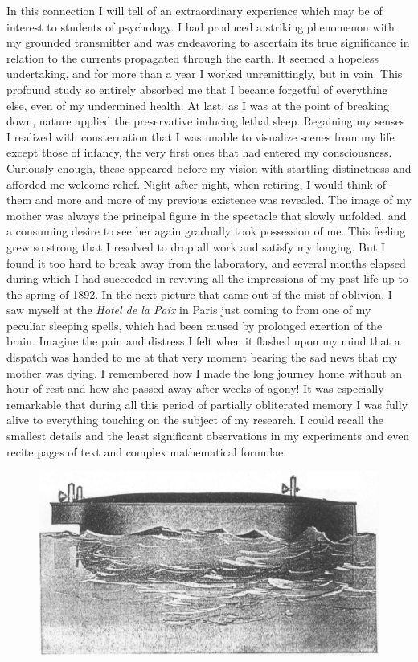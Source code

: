 \documentclass[a4paper,12pt,english,twoside,openright]{memoir}
\begin{document}
In this connection I will tell of an extraordinary experience which may be of interest to students of 
psychology.  I had produced a striking phenomenon with my grounded transmitter and was 
endeavoring to ascertain its true significance in relation to the currents propagated through the 
earth.  It seemed a hopeless undertaking, and for more than a year I worked unremittingly, but in 
vain.  This profound study so entirely absorbed me that I became forgetful of everything else, 
even of my undermined health.  At last, as I was at the point of breaking down, nature applied the 
preservative inducing lethal sleep.  Regaining my senses I realized with consternation that I was 
unable to visualize scenes from my life except those of infancy, the very first ones that had 
entered my consciousness.  Curiously enough, these appeared before my vision with startling 
distinctness and afforded me welcome relief.  Night after night, when retiring, I would think of 
them and more and more of my previous existence was revealed.  The image of my mother was 
always the principal figure in the spectacle that slowly unfolded, and a consuming desire to see 
her again gradually took possession of me.  This feeling grew so strong that I resolved to drop all 
work and satisfy my longing.  But I found it too hard to break away from the laboratory, and 
several months elapsed during which I had succeeded in reviving all the impressions of my past 
life up to the spring of 1892.  In the next picture that came out of the mist of oblivion, I saw myself 
at the \emph{Hotel de la Paix} in Paris just coming to from one of my peculiar sleeping spells, which had 
been caused by prolonged exertion of the brain.  Imagine the pain and distress I felt when it 
flashed upon my mind that a dispatch was handed to me at that very moment bearing the sad 
news that my mother was dying.  I remembered how I made the long journey home without an 
hour of rest and how she passed away after weeks of agony! It was especially remarkable that 
during all this period of partially obliterated memory I was fully alive to everything touching on the 
subject of my research.  I could recall the smallest details and the least significant observations in 
my experiments and even recite pages of text and complex mathematical formulae.  

\begin{figure}[b]
	\centering
	\includegraphics[width=.75\textwidth]{TelBoat.png}
\end{figure}
\end{document}
